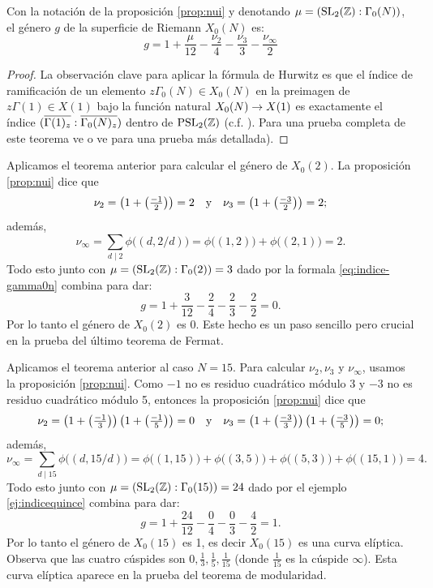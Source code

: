 \begin{thm}\label{thm:genus_curva_modular}
  Con la notaci\'on de la proposici\'on \ref{prop:nui} y denotando $\mu=(\mathrm{SL}_2(\mathbb{Z}):\Gamma_0(N))$,
  el g\'enero $g$ de la superficie de Riemann $X_0(N)$ es:
  \[
    g=1+\frac{\mu}{12}-\frac{\nu_2}{4}-\frac{\nu_3}{3}-\frac{\nu_{\infty}}{2}
  \]
\end{thm}
\begin{proof}
  La observaci\'on clave para aplicar la f\'ormula de Hurwitz es que el \'indice de ramificaci\'on
  de un elemento $z\Gamma_0(N)\in X_0(N)$ en la preimagen de $z\Gamma(1)\in X(1)$ bajo la funci\'on
  natural $X_0(N)\rightarrow X(1)$ es exactamente el \'indice $(\overline{\Gamma(1)_z}:\overline{\Gamma_0(N)_z})$ dentro
  de $\mathrm{PSL}_2(\mathbb{Z})$ (c.f. \cite[\S1.5, proposici\'on 1.37]{ShimuraITTATOAF}). Para una prueba
  completa de este teorema ve \cite[\S1.6, proposici\'on 1.40]{ShimuraITTATOAF} o ve
  \cite[Teorema 3.1.1]{DiamondShurmanAFCIMF} para una prueba m\'as detallada).
\end{proof}

\begin{ejemplo}\label{ej:X02}
	Aplicamos el teorema anterior para calcular el género de $X_0(2)$. La proposici\'on \ref{prop:nui} dice que
  \[
    \nu_2=\left( 1+\left( \tfrac{-1}{2} \right) \right)=2 \quad\text{y}\quad
    \nu_3=\left( 1+\left( \tfrac{-3}{2} \right) \right)=2;
  \]
  adem\'as,
  \[
    \nu_{\infty}=\sum_{d\mid2}\phi\big((d,2/d)\big)=
    \phi\big((1,2)\big)+\phi\big((2,1)\big)=2 .
  \]
  Todo esto junto con $\mu=(\mathrm{SL}_2(\mathbb{Z}):\Gamma_0(2))=3$ dado por la formala \ref{eq:indice-gamma0n}
  combina para dar:
  \[
    g=1+\frac{3}{12}-\frac{2}{4}-\frac{2}{3}-\frac{2}{2}=0.
  \]
  Por lo tanto el g\'enero de $X_0(2)$ es 0. Este hecho es un paso sencillo pero crucial en la prueba del último teorema de Fermat.
\end{ejemplo}

\begin{ejemplo}\label{ej:Gamma15}
  Aplicamos el teorema anterior al caso $N=15$. Para calcular $\nu_2,\nu_3$ y $\nu_{\infty}$,
  usamos la proposici\'on \ref{prop:nui}. Como $-1$ no es residuo cuadr\'atico m\'odulo 3 y
  $-3$ no es residuo cuadr\'atico m\'odulo 5, entonces la proposici\'on \ref{prop:nui} dice que
  \[
    \nu_2=\left( 1+\left( \tfrac{-1}{3} \right) \right)\left( 1+\left( \tfrac{-1}{5} \right) \right)=0 \quad\text{y}\quad
    \nu_3=\left( 1+\left( \tfrac{-3}{3} \right) \right)\left( 1+\left( \tfrac{-3}{5} \right) \right)=0;
  \]
  adem\'as,
  \[
    \nu_{\infty}=\sum_{d\mid15}\phi\big((d,15/d)\big)=
    \phi\big((1,15)\big)+\phi\big((3,5)\big)+\phi\big((5,3)\big)+\phi\big((15,1)\big)=4.
  \]
  Todo esto junto con $\mu=(\mathrm{SL}_2(\mathbb{Z}):\Gamma_0(15))=24$ dado por el ejemplo \ref{ej:indicequince}
  combina para dar:
  \[
    g=1+\frac{24}{12}-\frac{0}{4}-\frac{0}{3}-\frac{4}{2}=1.
  \]
  Por lo tanto el g\'enero de $X_0(15)$ es 1, es decir $X_0(15)$ es una curva el\'iptica. Observa que las cuatro cúspides son $0,\tfrac{1}{3},\tfrac{1}{5},\tfrac{1}{15}$ (donde $\tfrac{1}{15}$  es la c\'uspide $\infty$). Esta curva elíptica aparece en la prueba del teorema de modularidad.
\end{ejemplo}



